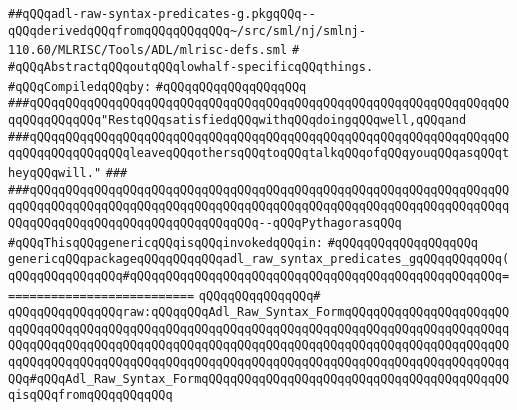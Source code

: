 \label{src/lib/compiler/back/low/tools/arch/adl-raw-syntax-predicates-g.pkg}
\verb|##qQQqadl-raw-syntax-predicates-g.pkgqQQq--qQQqderivedqQQqfromqQQqqQQqqQQq~/src/sml/nj/smlnj-110.60/MLRISC/Tools/ADL/mlrisc-defs.sml|\newline
\verb|#|\newline
\verb|#qQQqAbstractqQQqoutqQQqlowhalf-specificqQQqthings.|\newline
\newline
\verb|#qQQqCompiledqQQqby:|\newline
\verb|#qQQqqQQqqQQqqQQqqQQq|\newline
\newline
\newline
\newline
\verb|###qQQqqQQqqQQqqQQqqQQqqQQqqQQqqQQqqQQqqQQqqQQqqQQqqQQqqQQqqQQqqQQqqQQqqQQqqQQqqQQq"RestqQQqsatisfiedqQQqwithqQQqdoingqQQqwell,qQQqand|\newline
\verb|###qQQqqQQqqQQqqQQqqQQqqQQqqQQqqQQqqQQqqQQqqQQqqQQqqQQqqQQqqQQqqQQqqQQqqQQqqQQqqQQqqQQqleaveqQQqothersqQQqtoqQQqtalkqQQqofqQQqyouqQQqasqQQqtheyqQQqwill."|\newline
\verb|###|\newline
\verb|###qQQqqQQqqQQqqQQqqQQqqQQqqQQqqQQqqQQqqQQqqQQqqQQqqQQqqQQqqQQqqQQqqQQqqQQqqQQqqQQqqQQqqQQqqQQqqQQqqQQqqQQqqQQqqQQqqQQqqQQqqQQqqQQqqQQqqQQqqQQqqQQqqQQqqQQqqQQqqQQqqQQqqQQqqQQq--qQQqPythagorasqQQq|\newline
\newline
\newline
\newline
\verb|#qQQqThisqQQqgenericqQQqisqQQqinvokedqQQqin:|\newline
\verb|#qQQqqQQqqQQqqQQqqQQq|\newline
\newline
\verb|genericqQQqpackageqQQqqQQqqQQqadl_raw_syntax_predicates_gqQQqqQQqqQQq(|\newline
\verb|qQQqqQQqqQQqqQQq#qQQqqQQqqQQqqQQqqQQqqQQqqQQqqQQqqQQqqQQqqQQqqQQqqQQq===========================|\newline
\verb|qQQqqQQqqQQqqQQq#|\newline
\verb|qQQqqQQqqQQqqQQqraw:qQQqqQQqAdl_Raw_Syntax_FormqQQqqQQqqQQqqQQqqQQqqQQqqQQqqQQqqQQqqQQqqQQqqQQqqQQqqQQqqQQqqQQqqQQqqQQqqQQqqQQqqQQqqQQqqQQqqQQqqQQqqQQqqQQqqQQqqQQqqQQqqQQqqQQqqQQqqQQqqQQqqQQqqQQqqQQqqQQqqQQqqQQqqQQqqQQqqQQqqQQqqQQqqQQqqQQqqQQqqQQqqQQqqQQqqQQqqQQqqQQqqQQqqQQqqQQqqQQq#qQQqAdl_Raw_Syntax_FormqQQqqQQqqQQqqQQqqQQqqQQqqQQqqQQqqQQqqQQqqQQqisqQQqfromqQQqqQQqqQQq|\newline
